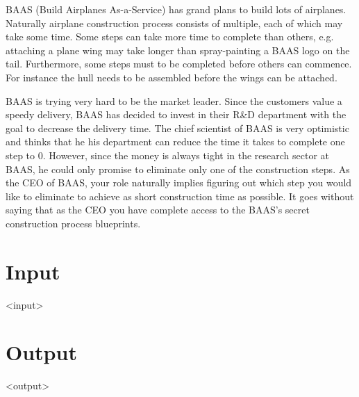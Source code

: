 
BAAS (Build Airplanes As-a-Service) has grand plans to build lots of airplanes.
Naturally airplane construction process consists of multiple, each of which may take some time.
Some steps can take more time to complete than others, e.g. attaching a plane wing may take longer than spray-painting a BAAS logo on the tail.
Furthermore, some steps must to be completed before others can commence. For instance the hull needs to be assembled before the wings can be attached.

BAAS is trying very hard to be the market leader.
Since the customers value a speedy delivery, BAAS has decided to invest in their R\&D department with the goal to decrease the delivery time.
The chief scientist of BAAS is very optimistic and thinks that he his department can reduce the time it takes to complete one step to 0.
However, since the money is always tight in the research sector at BAAS, he could only promise to eliminate only one of the construction steps.
As the CEO of BAAS, your role naturally implies figuring out which step you would like to eliminate to achieve as short construction time as possible.
It goes without saying that as the CEO you have complete access to the BAAS's secret construction process blueprints.

\section*{Input}

<input>

\section*{Output}

<output>
